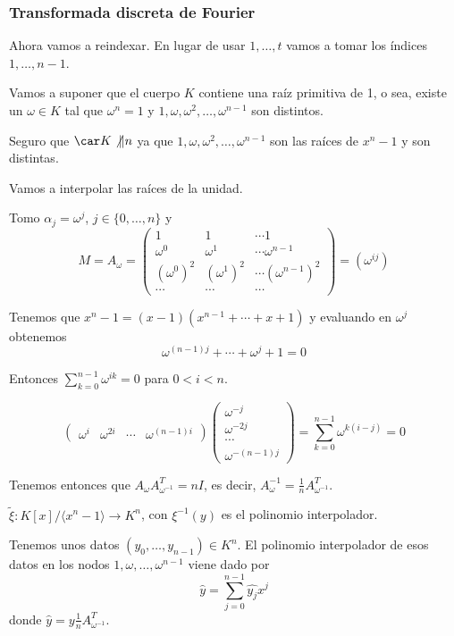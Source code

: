 \subsubsection{Transformada discreta de Fourier}

Ahora vamos a reindexar. En lugar de usar \(1,\ldots, t\)
vamos a tomar los índices \(1,\ldots, n-1\).

Vamos a suponer que el cuerpo \(K\)
contiene una raíz primitiva de 1, o sea,
existe un \(\omega\in K\) tal que \(\omega^n = 1\) y
\(1, \omega, \omega^2,\ldots, \omega^{n-1}\) son distintos.

Seguro que \(\car K \not\| n\) ya que \(1, \omega, \omega^2,\ldots,
\omega^{n-1}\) son las raíces de \(x^n-1\) y son distintas.

Vamos a interpolar las raíces de la unidad.

Tomo \(\alpha_j =\omega^j\), \(j\in\{0,\ldots, n\}\) y
\[M=A_\omega=
\begin{pmatrix}
  1&1&\cdots1\\
  \omega^0&\omega^1&\cdots\omega^{n-1}\\
  {(\omega^0)}^2&{(\omega^1)}^2&\cdots{(\omega^{n-1})}^2\\
  \cdots&\cdots&\cdots
\end{pmatrix}= (\omega^{ij})
\]


Tenemos que \(x^n-1=(x-1)(x^{n-1}+\cdots+x+1)\)
y evaluando en \(\omega^{j}\) obtenemos
\[
  \omega^{(n-1)j}+\cdots+\omega^j+1=0
\]

Entonces \(\sum_{k=0}^{n-1}\omega^{ik}=0\) para \(0<i<n\).

\[
  \begin{pmatrix}
    \omega^{i}&
    \omega^{2i}&
    \cdots&
    \omega^{(n-1)i}
  \end{pmatrix}
  \begin{pmatrix}
    \omega^{-j}\\
    \omega^{-2j}\\
    \cdots\\
    \omega^{-(n-1)j}
  \end{pmatrix}
  =\sum_{k=0}^{n-1}\omega^{k(i-j)}=0
\]

Tenemos entonces que \(A_\omega A_{\omega^{-1}}^T=nI\),
es decir, \(A^{-1}_\omega=\frac{1}{n}A_{\omega^{-1}}^T\).

\(\tilde{\xi}:K[x]/\langle x^n-1\rangle\longrightarrow K^n\),
con \(\xi^{-1}(y)\) es el polinomio interpolador.

Tenemos unos datos \((y_0,\ldots, y_{n-1})\in K^n\). El polinomio
interpolador de esos datos en los nodos \(1,\omega,\ldots,\omega^{n-1}\)
viene dado por
\[
  \hat{y} =\sum_{j=0}^{n-1}\hat{y_j}x^j
\]
donde \(\hat{y}=y\frac{1}{n}A^T_{\omega^{-1}}\).

